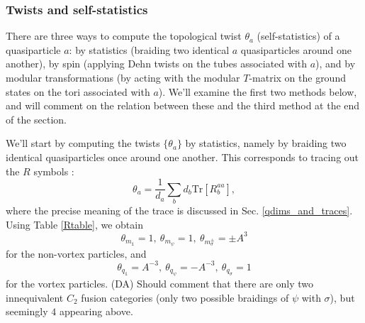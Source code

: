 \documentclass[12pt,a4paper]{article}
\newcommand{\unit}{\mathds{1}}
\newcommand\be            {\begin{equation}}
\newcommand\ee            {\end{equation}}
\newcommand{\dave}[1]{{\color{ao(english)}\footnotesize{(DA) #1}}}
\newcommand{\ethan}[1]{{\color{amethyst}\footnotesize{(EL) #1}}}
\begin{document}

\subsubsection{Twists and self-statistics}

There are three ways to compute the topological twist $\theta_a$ (self-statistics) of a quasiparticle $a$: by statistics (braiding two identical $a$ quasiparticles around one another), by spin (applying Dehn twists on the tubes associated with $a$), and by modular transformations (by acting with the modular $T$-matrix on the ground states on the tori associated with $a$). 
We'll examine the first two methods below, and will comment on the relation between these and the third method at the end of the section. 

We'll start by computing the twists $\{\theta_a\}$ by statistics, namely by braiding two identical quasiparticles once around one another. 
This corresponds to tracing out the $R$ symbols \cite{barkeshli2014}:
\be \label{Tmattr} \theta_a = \frac{1}{d_a}\sum_b d_b \text{Tr}[R^{aa}_b],\ee
where the precise meaning of the trace is discussed in Sec. \ref{qdims_and_traces}.
Using Table \ref{Rtable}, we obtain
\be \theta_{m_\unit} = 1,\ \theta_{m_\psi} = 1,\ \theta_{m^\pm_\sigma} = \pm A^3\ee
for the non-vortex particles, and 
\be \theta_{q_\unit} = A^{-3},\ \theta_{q_\psi} = -A^{-3},\ \theta_{q_\sigma} = 1\ee
for the vortex particles. 
\dave{Should comment that there are only two innequivalent $C_2$ fusion categories (only two possible braidings of $\psi$ with $\sigma$), 
but seemingly $4$ appearing above.}
\end{document}
